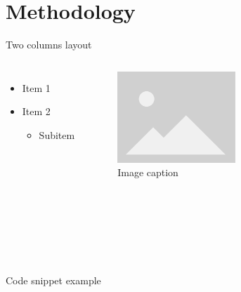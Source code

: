 \documentclass{beamer}
\begin{document}
\section{Methodology}
\begin{frame}{Two columns layout}
    \begin{columns}

        \begin{itemize}
            \item Item 1
            \item Item 2 
            \begin{itemize}
                \item Subitem 
            \end{itemize}
        \end{itemize}
        
        \begin{figure}
            \centering
            \includegraphics[height=0.5\textwidth]{images/placeholder_image.png}
            \caption{Image caption}
            \label{fig:figure1}
        \end{figure}
        
    \end{columns}

    
\end{frame}

\begin{frame}{Code snippet example}
    

\end{frame}
\end{document}

